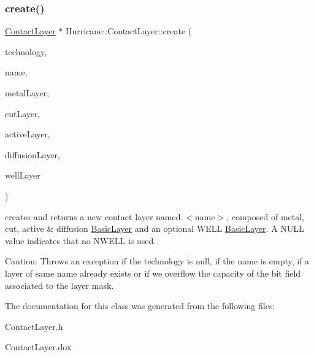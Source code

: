\subsubsection{\texorpdfstring{create()}{create()}}
{\footnotesize\ttfamily \mbox{\hyperlink{classHurricane_1_1ContactLayer}{Contact\+Layer}} $\ast$ Hurricane\+::\+Contact\+Layer\+::create (\begin{DoxyParamCaption}\item[{\mbox{\hyperlink{classHurricane_1_1Technology}{Technology}} $\ast$}]{technology,  }\item[{const \mbox{\hyperlink{classHurricane_1_1Name}{Name}} \&}]{name,  }\item[{\mbox{\hyperlink{classHurricane_1_1BasicLayer}{Basic\+Layer}} $\ast$}]{metal\+Layer,  }\item[{\mbox{\hyperlink{classHurricane_1_1BasicLayer}{Basic\+Layer}} $\ast$}]{cut\+Layer,  }\item[{\mbox{\hyperlink{classHurricane_1_1BasicLayer}{Basic\+Layer}} $\ast$}]{active\+Layer,  }\item[{\mbox{\hyperlink{classHurricane_1_1BasicLayer}{Basic\+Layer}} $\ast$}]{diffusion\+Layer,  }\item[{\mbox{\hyperlink{classHurricane_1_1BasicLayer}{Basic\+Layer}} $\ast$}]{well\+Layer }\end{DoxyParamCaption})\hspace{0.3cm}{\ttfamily [static]}}

creates and returns a new contact layer named {\ttfamily $<$name$>$}, composed of metal, cut, active \& diffusion \mbox{\hyperlink{classHurricane_1_1BasicLayer}{Basic\+Layer}} and an optional W\+E\+LL \mbox{\hyperlink{classHurricane_1_1BasicLayer}{Basic\+Layer}}. A N\+U\+LL value indicates that no N\+W\+E\+LL is used.

\begin{DoxyParagraph}{Caution\+: Throws an exception if the technology is null, if the name is }
empty, if a layer of same name already exists or if we overflow the capacity of the bit field associated to the layer mask. 
\end{DoxyParagraph}


The documentation for this class was generated from the following files\+:\begin{DoxyCompactItemize}
\item 
Contact\+Layer.\+h\item 
Contact\+Layer.\+dox\end{DoxyCompactItemize}
